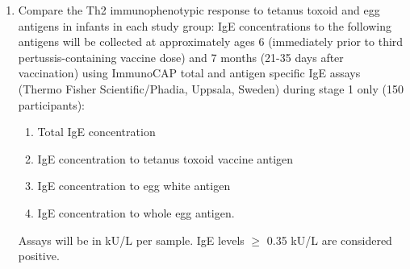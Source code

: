 \documentclass{bmcart}
\begin{document}
\begin{enumerate}[resume]
	\item Compare the Th2 immunophenotypic response to tetanus toxoid and egg antigens in infants in each study group:
	IgE concentrations to the following antigens will be collected at approximately ages 6 (immediately prior to third pertussis-containing vaccine dose) and 7 months (21-35 days after vaccination) using ImmunoCAP total and antigen specific IgE assays (Thermo Fisher Scientific/Phadia, Uppsala, Sweden) during stage 1 only (150 participants):
	\begin{enumerate}
		\item Total IgE concentration
		\item IgE concentration to tetanus toxoid vaccine antigen
		\item IgE concentration to egg white antigen
		\item IgE concentration to whole egg antigen.
	\end{enumerate}
	Assays will be in kU/L per sample.
	IgE levels $\geq$ 0.35 kU/L are considered positive.
\end{enumerate}
\end{document}

